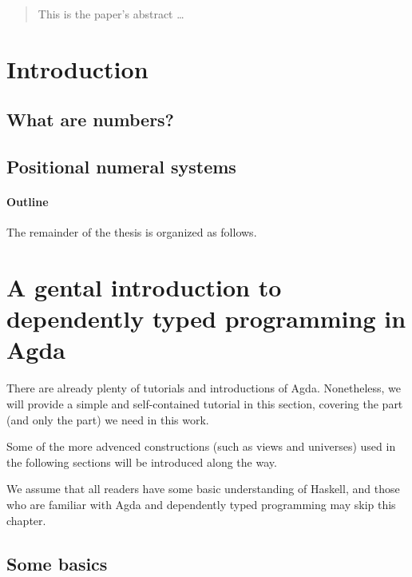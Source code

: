 \documentclass[12pt, a4paper]{article}
\begin{document}
\maketitle

\begin{abstract}
This is the paper's abstract \ldots
\end{abstract}

\section{Introduction}


\subsection{What are numbers?}\label{num}


\subsection{Positional numeral systems}\label{pos}


\paragraph{Outline}
The remainder of the thesis is organized as follows.

\section{A gental introduction to dependently typed programming in Agda}\label{agda}

There are already plenty of tutorials and introductions of Agda\cite{norell2009dependently}.
Nonetheless, we will provide a simple and self-contained tutorial in this section,
covering the part (and only the part) we need in this work.

Some of the more advenced constructions (such as views and universes) used in
the following sections will be introduced along the way.

We assume that all readers have some basic understanding of Haskell, and those
who are familiar with Agda and dependently typed programming may skip this chapter.

\subsection{Some basics}
\end{document}
